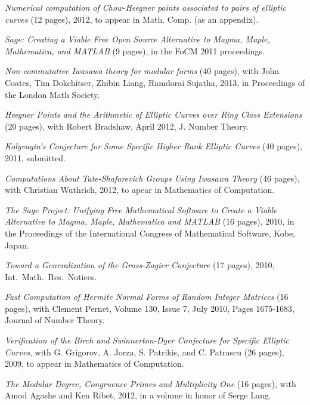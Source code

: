 \documentclass[10pt]{article}
\newcommand{\ptitle}{\em}
\newcounter{totalnumpapers}
\newenvironment{papers}
   {
   \begin{revnumerate}[\value{totalnumpapers}]
   {}
         {
            \setlength{\itemsep}{.5ex}
            \setlength{\parsep}{0ex}
            \setlength{\leftmargin}{0em}
            \setlength{\parskip}{0ex}
            \setlength{\topsep}{0ex}
         }
   }
   {
\end{revnumerate}
   }
\newcommand{\marginlabel}[1]{
\begin{minipage}[b]{0.8\labelwidth}{\large \textsf{\textbf{#1}}}\end{minipage}}
\newcommand{\entrylabel}[1]{\mbox{\marginlabel{#1}}\hfill}
\newcommand{\MainListlabel}[1]
   {
      \parbox[t]{\labelwidth}{\hspace{.8em}\marginlabel{#1}}
   }
\newenvironment{MainList}[1]
   {
      \renewcommand{\entrylabel}{\MainListlabel}
      \begin{list}{}
      {
         \renewcommand{\makelabel}{\entrylabel}
         \setlength   {\itemindent}{-.65em}
         \setlength   {\labelwidth}{#1}
         \setlength   {\leftmargin}{\labelwidth}
         \setlength   {\itemsep}{3ex}
      }
   }
   {
      \end{list}
   }
\begin{document}
\begin{MainList}{88pt}
\begin{papers}
\item {\ptitle Numerical computation of Chow-Heegner points associated
to pairs of elliptic curves} (12 pages), 2012, to appear in Math. Comp. (as an appendix).

\item {\ptitle Sage: Creating a Viable Free Open Source Alternative
to Magma, Maple, Mathematica, and MATLAB} (9 pages), in the
FoCM 2011 proceedings.

\item {\ptitle Non-commutative Iwasawa theory for modular forms} (40 pages), with
John Coates, Tim Dokchitser, Zhibin Liang, Ramdorai Sujatha, 2013, in Proceedings of the London Math Society.

 \item {\ptitle Heegner Points and the Arithmetic of Elliptic Curves
     over Ring Class Extensions} (20 pages), with Robert Bradshaw,
   April 2012, J. Number Theory.

 \item {\ptitle Kolyvagin's Conjecture for Some Specific Higher Rank
     Elliptic Curves} (40 pages), 2011, submitted.

\item {\ptitle Computations About Tate-Shafarevich Groups Using
    Iwasawa Theory} (46 pages), with Christian Wuthrich, 2012, to
apear in Mathematics of Computation.

 \item {\ptitle The Sage Project: Unifying Free Mathematical Software
     to Create a Viable Alternative to Magma, Maple, Mathematica and
     MATLAB} (16 pages), 2010, in the Proceedings of the International
   Congress of Mathematical Software, Kobe, Japan.

\item {\ptitle Toward a Generalization of the Gross-Zagier Conjecture}
  (17 pages), 2010, Int.\ Math.\ Res.\ Notices.

\item {\ptitle Fast Computation of Hermite Normal Forms of Random
    Integer Matrices} (16 pages), with Clement Pernet,
Volume 130, Issue 7, July 2010, Pages 1675-1683, Journal of Number Theory.

\item {\ptitle Verification of the Birch and Swinnerton-Dyer
    Conjecture for Specific Elliptic Curves}, with G. Grigorov, A.
  Jorza, S. Patrikis, and C. Patrascu (26 pages), 2009, to appear in
  Mathematics of Computation.

\item {\em The Modular Degree, Congruence Primes and Multiplicity One}
  (16 pages), with Amod Agashe and Ken Ribet, 2012, in
a volume in honor of Serge Lang.


\end{papers}
\end{MainList}
\end{document}
